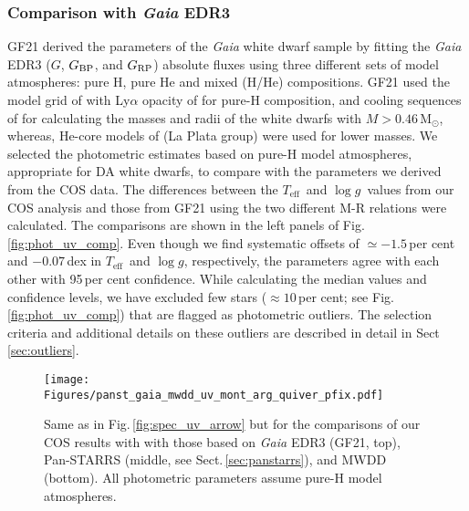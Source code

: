 \documentclass[fleqn,usenatbib, useAMS]{mnras}
\newcommand{\Teff}{\mbox{$T_{\mathrm{eff}}$}}
\newcommand{\logg}{\mbox{$\log g$}}
\newcommand{\Msun}{\mbox{$\mathrm{M_\odot}$}}
\begin{document}
\subsubsection{Comparison with \textit{Gaia} EDR3}
GF21 derived the parameters of the \textit{Gaia} white dwarf sample by fitting the \textit{Gaia} EDR3 ($G$, $G{\rm_{BP}}$, and $G{\rm_{RP}}$) absolute fluxes using three different sets of model atmospheres: pure H, pure He and mixed (H/He) compositions. GF21 used the model grid of \cite{Tremblay2011} with Ly$\alpha$ opacity of \cite{Kowalski2006} for pure-H composition, and cooling sequences of \cite{Bedard2020} for calculating the masses and radii of the white dwarfs with $M>0.46\,\Msun$, whereas, He-core models of \cite{Serenelli2001} (La Plata group) were used for lower masses. We selected the photometric estimates based on pure-H model atmospheres, appropriate for DA white dwarfs, to compare with the parameters we derived from the COS data. The differences between the \Teff\ and \logg\ values from our COS analysis and those from GF21 using the two different M-R relations were calculated. The comparisons are shown in the left panels of Fig.\,\ref{fig:phot_uv_comp}. Even though we find systematic offsets of $\simeq-1.5$\,per cent and $-0.07$\,dex in \Teff\ and \logg, respectively, the parameters agree with each other with 95\,per cent confidence. While calculating the median values and confidence levels, we have excluded few stars ($\approx10$\,per cent; see Fig.\,\ref{fig:phot_uv_comp}) that are flagged as photometric outliers. The selection criteria and additional details on these outliers are described in detail in Sect\,\ref{sec:outliers}.

\begin{figure}
\centering
\texttt{[image: Figures/panst\_gaia\_mwdd\_uv\_mont\_arg\_quiver\_pfix.pdf]}
\caption{Same as in Fig.\,\ref{fig:spec_uv_arrow} but for the comparisons of our COS results with with those based on \textit{Gaia} EDR3 (GF21,  top), Pan-STARRS (middle, see Sect.\,\ref{sec:panstarrs}), and MWDD (bottom). All photometric parameters assume pure-H model atmospheres.}
\label{fig:phot_uv_arrow}
\end{figure}
\end{document}
